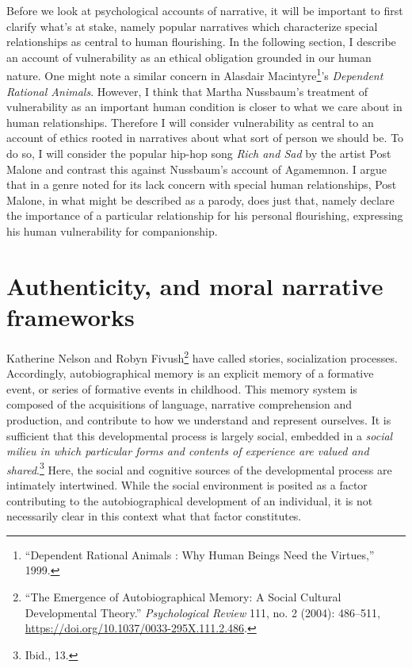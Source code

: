 \documentclass[phdthesis,12pt,final,a4paper]{wuthesis}
\theoremstyle{definition}
\theoremstyle{definition}
\theoremstyle{definition}
\theoremstyle{definition}
\theoremstyle{remark}
\begin{document}
Before we look at psychological accounts of narrative, it will be important to first clarify what's at stake, namely popular narratives which characterize special relationships as central to human flourishing. In the following section, I describe an account of vulnerability as an ethical obligation grounded in our human nature. One might note a similar concern in Alasdair Macintyre\footnote{{``Dependent Rational Animals : Why Human Beings Need the Virtues,''} 1999.}'s \emph{Dependent Rational Animals}. However, I think that Martha Nussbaum's treatment of vulnerability as an important human condition is closer to what we care about in human relationships. Therefore I will consider vulnerability as central to an account of ethics rooted in narratives about what sort of person we should be. To do so, I will consider the popular hip-hop song \emph{Rich and Sad} by the artist Post Malone and contrast this against Nussbaum's account of Agamemnon. I argue that in a genre noted for its lack concern with special human relationships, Post Malone, in what might be described as a parody, does just that, namely declare the importance of a particular relationship for his personal flourishing, expressing his human vulnerability for companionship.

\section{Authenticity, and moral narrative frameworks}\label{authenticity-and-moral-narrative-frameworks}

Katherine Nelson and Robyn Fivush\footnote{{``The {Emergence} of {Autobiographical Memory}: {A Social Cultural Developmental Theory}.''} \emph{Psychological Review} 111, no. 2 (2004): 486--511, \url{https://doi.org/10.1037/0033-295X.111.2.486}.} have called stories, socialization processes. Accordingly, autobiographical memory is an explicit memory of a formative event, or series of formative events in childhood. This memory system is composed of the acquisitions of language, narrative comprehension and production, and contribute to how we understand and represent ourselves. It is sufficient that this developmental process is largely social, embedded in a \emph{social milieu in which particular forms and contents of experience are valued and shared}.\footnote{Ibid., 13.} Here, the social and cognitive sources of the developmental process are intimately intertwined. While the social environment is posited as a factor contributing to the autobiographical development of an individual, it is not necessarily clear in this context what that factor constitutes.
\end{document}
